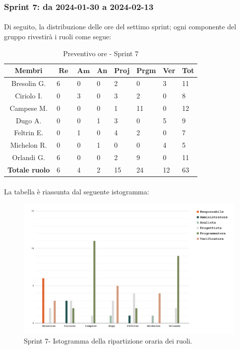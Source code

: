 \documentclass[10pt, a4paper]{article}
\begin{document}
{{{{{{{{{{{{{{%
\subsubsection{Sprint 7: da 2024-01-30 a 2024-02-13}
\paragraph{}Di seguito, la distribuzione delle ore del settimo sprint; ogni componente del gruppo rivestirà i ruoli come segue:
\begin{table}[H]
\begin{tabularx}{\textwidth}{c|X|X|X|X|X|X|X}
        \textbf{Membri} & $\operatorname{\textbf{Re}}$ & $\mathrm{\textbf{Am}}$ & \textbf{An} & \textbf{Proj} & \textbf{Prgm} & \textbf{Ver} & \textbf{Tot} \\
        \hline Bresolin G. & \cellcolor{primarycolor}6 & 0 & 0 & 2 & 0 & 3 & 11 \\
        \hline Ciriolo I.  & 0 & \cellcolor{primarycolor}3 & 0 & 3 & 2 & 0 & 8 \\
        \hline Campese M.  & 0 & 0 & 0 & 1 & \cellcolor{primarycolor}11 & 0 & 12 \\
        \hline Dugo A.     & 0 & 0 & 1 & 3 & 0 & \cellcolor{primarycolor}5 & 9 \\
        \hline Feltrin E.  & 0 & 1 & 0 & \cellcolor{primarycolor}4 & 2 & 0 & 7 \\
        \hline Michelon R. & 0 & 0 & 1 & 0 & 0 & \cellcolor{primarycolor}4 & 5 \\
        \hline Orlandi G.  & 6 & 0 & 0 & 2 & \cellcolor{primarycolor}9 & 0 & 11 \\
        \hline
        \textbf{Totale ruolo} & 6 & 4 & 2 & 15 & 24 & 12 & 63 
    \end{tabularx}
    \caption{Preventivo ore - Sprint 7}
    \end{table}

\paragraph{}La tabella è riassunta dal seguente istogramma:
 \begin{figure}[H]
        \centering        
        \includegraphics[width=15.5cm]{istogrammi/istogramma_7_periodo.png}
        \caption{Sprint 7- Istogramma della ripartizione oraria dei ruoli. }
    \end{figure}

}}}}}}}}}}}}}}
\end{document}
